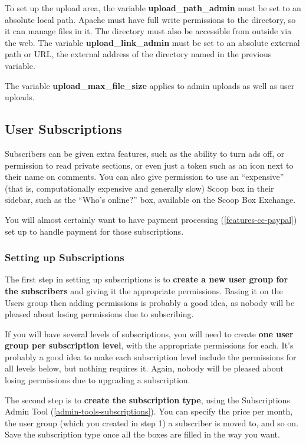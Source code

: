 To set up the upload area, the variable {\bf upload\_path\_admin} must be set to an absolute local path.  Apache must have full write permissions to the directory, so it can manage files in it. The directory must also be accessible from outside via the web. The variable {\bf upload\_link\_admin} must be set to an absolute external path or URL, the external address of the directory named in the previous variable.

The variable {\bf upload\_max\_file\_size} applies to admin uploads as well as user uploads.

\subsection{User Subscriptions}
\label{features-subscriptions}

Subscribers can be given extra features, such as the ability to turn ads off, or permission to read private sections, or even just a token such as an icon next to their name on comments.  You can also give permission to use an ``expensive'' (that is, computationally expensive and generally slow) Scoop box in their sidebar, such as the ``Who's online?'' box, available on the Scoop Box Exchange.

You will almost certainly want to have payment processing (\ref{features-cc-paypal}) set up to handle payment for those subscriptions.

\subsubsection{Setting up Subscriptions}

The first step in setting up subscriptions is to {\bf create a new user group for the subscribers} and giving it the appropriate permissions.  Basing it on the Users group then adding permissions is probably a good idea, as nobody will be pleased about losing permissions due to subscribing.

If you will have several levels of subscriptions, you will need to create {\bf one user group per subscription level}, with the appropriate permissions for each.  It's probably a good idea to make each subscription level include the permissions for all levels below, but nothing requires it.  Again, nobody will be pleased about losing permissions due to upgrading a subscription.

The second step is to {\bf create the subscription type}, using the Subscriptions Admin Tool (\ref{admin-tools-subscriptions}).  You can specify the price per month, the user group (which you created in step 1) a subscriber is moved to, and so on.  Save the subscription type once all the boxes are filled in the way you want.

